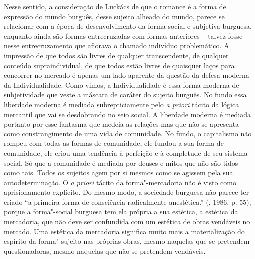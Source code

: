 Nesse sentido, a consideração de Luckács de que o romance é a forma de
expressão do mundo burguês, desse sujeito alheado do mundo, parece se
relacionar com a época de desenvolvimento da forma social e subjetiva
burguesa, enquanto ainda são formas entrecruzadas com formas anteriores
-- talvez fosse nesse entrecruzamento que aflorava o chamado indivíduo
problemático. A impressão de que todos são livres de qualquer
transcendente, de qualquer conteúdo supraindividual, de que todos estão
livres de quaisquer laços para concorrer no mercado é apenas um lado
aparente da questão da defesa moderna da Individualidade. Como vimos, a
Individualidade é essa forma moderna de subjetividade que veste a
máscara de caráter do sujeito burguês. No fundo essa liberdade moderna é
mediada subrepticiamente pelo \emph{a priori} tácito da lógica mercantil
que vai se desdobrando no seio social. A liberdade moderna é mediada
portanto por esse fantasma que medeia as relações mas que não se
apresenta como constrangimento de uma vida de comunidade. No fundo, o
capitalismo não rompeu com todas as formas de comunidade, ele fundou a
sua forma de comunidade, ele criou uma tendência à perfeição e à
completude de seu sistema social. Só que a comunidade é mediada por
deuses e mitos que não são tidos como tais. Todos os sujeitos agem por
si mesmos como se agissem pela sua autodeterminação. O \emph{a priori}
tácito da forma"-mercadoria não é visto como aprisionamento explícito. Do
mesmo modo, a sociedade burguesa não parece ter criado ``a primeira
forma de consciência radicalmente anestética.'' (, 1986, p. 55),
porque a forma"-social burguesa tem ela própria a sua estética, a
estética da mercadoria, que não deve ser confundida com um estética de
obras vendáveis no mercado. Uma estética da mercadoria significa muito
mais a materialização do espírito da forma"-sujeito nas próprias obras,
mesmo naquelas que se pretendem questionadoras, mesmo naquelas que não
se pretendem vendáveis.

